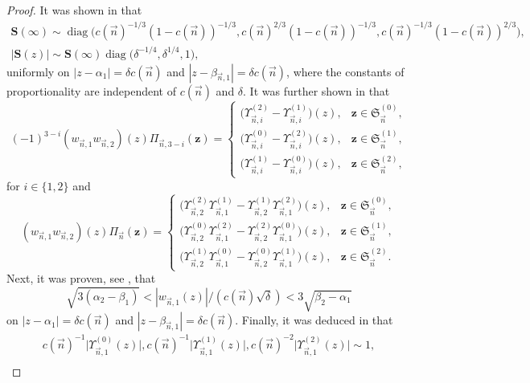 \documentclass[pdftex]{sigma}
\numberwithin{equation}{section}
\newcommand{\diag}{\operatorname{diag}}
\newcommand{\n}{{\vec n}}
\newcommand{\RS}{\boldsymbol{\mathfrak{S}}}
\newcommand{\z}	{{\boldsymbol z}}
\begin{document}
\begin{proof}
It was shown in \cite[Lemma~7.3]{ApDenYa21} that
\begin{gather}
\boldsymbol S(\infty) \sim \diag\bigl(c(\n)^{-1/3}(1-c(\n))^{-1/3},c(\n)^{2/3}(1-c(\n))^{-1/3},c(\n)^{-1/3}(1-c(\n))^{2/3}\bigr),\nonumber \\
|\boldsymbol S(z)| \sim \boldsymbol S(\infty)\diag\bigl(\delta^{-1/4},\delta^{1/4},1\bigr),\label{6.2.1}
\end{gather}
uniformly on $ |z-\alpha_1| = \delta c(\n) $ and $ |z-\beta_{\n,1}| = \delta c(\n) $, where the constants of proportionality are independent of $ c(\n) $ and $ \delta $. It was further shown in \cite[Lemma~5.3]{ApDenYa21} that
\begin{equation}
\label{6.2.3}
(-1)^{3-i}(w_{\n,1}w_{\n,2})(z)\Pi_{\n,3-i}(\z) =
\begin{cases}
\bigl(\Upsilon_{\n,i}^{(2)}-\Upsilon_{\n,i}^{(1)}\bigr)(z), & \z\in\RS_\n^{(0)}, \\[1mm]
\bigl(\Upsilon_{\n,i}^{(0)}-\Upsilon_{\n,i}^{(2)}\bigr)(z), & \z\in\RS_\n^{(1)}, \\[1mm]
\bigl(\Upsilon_{\n,i}^{(1)}-\Upsilon_{\n,i}^{(0)}\bigr)(z), & \z\in\RS_\n^{(2)},
\end{cases}
\end{equation}
for $ i\in\{1,2\} $ and
\begin{equation*}
(w_{\n,1}w_{\n,2})(z)\Pi_\n(\z) =
\begin{cases}
\bigl(\Upsilon_{\n,2}^{(2)}\Upsilon_{\n,1}^{(1)}-\Upsilon_{\n,2}^{(1)}\Upsilon_{\n,1}^{(2)}\bigr)(z), & \z\in\RS_\n^{(0)}, \\[1mm]
\bigl(\Upsilon_{\n,2}^{(0)}\Upsilon_{\n,1}^{(2)}-\Upsilon_{\n,2}^{(2)}\Upsilon_{\n,1}^{(0)}\bigr)(z), & \z\in\RS_\n^{(1)}, \\[1mm]
\bigl(\Upsilon_{\n,2}^{(1)}\Upsilon_{\n,1}^{(0)}-\Upsilon_{\n,2}^{(0)}\Upsilon_{\n,1}^{(1)}\bigr)(z), & \z\in\RS_\n^{(2)}.
\end{cases}
\end{equation*}
Next, it was proven, see \cite[equation~(5.23)]{ApDenYa21}, that
\[
\sqrt{3(\alpha_2-\beta_1)} < |w_{\n,1}(z)|/ (c(\n)\sqrt\delta) < 3\sqrt{\beta_2-\alpha_1}
\]
on $ |z-\alpha_1| = \delta c(\n) $ and $ |z-\beta_{\n,1}| = \delta c(\n) $. Finally, it was deduced in \cite[Lemma~5.2]{ApDenYa21} that
\begin{gather}
c(\n)^{-1}\big|\Upsilon_{\n,1}^{(0)}(z)\big|, c(\n)^{-1}\big|\Upsilon_{\n,1}^{(1)}(z)\big|, c(\n)^{-2}\big|\Upsilon_{\n,1}^{(2)}(z)\big| \sim 1, \nonumber \\

\end{gather}
\end{proof}
\end{document}
